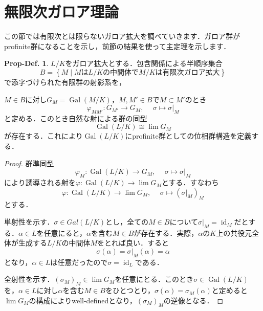 \documentclass[dvipdfmx,b5paper,papersize]{jsarticle}
\theoremstyle{definition}
\newtheorem{prop-def}[thm]{Prop-Def.}
\DeclareMathOperator{\Gal}{Gal}
\DeclareMathOperator{\id}{id}
\begin{document}
\section{無限次ガロア理論}
この節では有限次とは限らないガロア拡大を調べていきます．ガロア群がprofinite群になることを示し，前節の結果を使って主定理を示します．
\begin{prop-def}
  $L/K$をガロア拡大とする．包含関係による半順序集合
  \[
  B=\left\{M \mid \text{$M$は$L/K$の中間体で$M/K$は有限次ガロア拡大}\right\}
  \]
  で添字づけられた有限群の射影系を，

  $M \in B$に対し$G_M =\Gal(M/K)$，$M, M' \in B$で$M \subset M'$のとき
  \[
  \varphi_{MM'} \colon G_{M'} \to G_{M}, \hspace{15pt} \sigma \mapsto \sigma \rvert _M
  \]
  と定める．このとき自然な射による群の同型
  \[
  \Gal(L/K) \cong \lim G_M
  \]
  が存在する．これにより$\Gal(L/K)$にprofinite群としての位相群構造を定義する．
\end{prop-def}
\begin{proof}
  群準同型\[
  \varphi_M \colon \Gal(L/K) \to G_M,\hspace{15pt} \sigma \mapsto \sigma \rvert _M
  \]により誘導される射を$\varphi \colon \Gal(L/K) \to \lim G_M$とする．すなわち
  \[
  \varphi \colon \Gal(L/K) \to \lim G_M,\hspace{15pt} \sigma \mapsto (\sigma \lvert_M)_M
  \]
  とする．

  単射性を示す．$\sigma \in Gal(L/K)$とし，全ての$M \in B$について$\sigma \lvert_M =\id_M$だとする．$\alpha \in L$を任意にると，$\alpha$を含む$M \in B$が存在する．実際，$\alpha$の$K$上の共役元全体が生成する$L/K$の中間体$M$をとれば良い．すると
  \[
  \sigma (\alpha)=\sigma \lvert_M (\alpha)=\alpha
  \]
  となり，$\alpha \in L$は任意だったので$\sigma = \id_L$である．

  全射性を示す．$(\sigma_M)_M \in \lim G_M$を任意にとる．このとき$\sigma \in \Gal(L/K)$を，$\alpha \in L$に対し$\alpha$を含む$M \in B$をひとつとり，$\sigma (\alpha)=\sigma_M (\alpha)$と定めると$\lim G_M$の構成によりwell-definedとなり，$(\sigma_M)_M$の逆像となる．
\end{proof}
\end{document}
